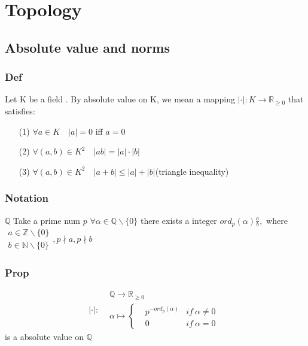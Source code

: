 \documentclass{book}
\begin{document}
\part{Topology}
\chapter{Absolute value and norms}
\section{Def}
Let K be a field . By absolute value on K, we mean a mapping $\lvert \cdot\rvert:K\rightarrow\mathbb{R} _{\geq0}$ that satisfies:\begin{itemize}
    \item[(1)] $\forall a\in K\quad\lvert a\rvert=0 $ iff $a=0$
    \item[(2)] $\forall (a,b)\in K^2\quad\lvert ab\rvert=\lvert a\rvert\cdot\lvert b\rvert$
    \item[(3)] $\forall (a,b)\in K^2\quad\lvert a+b\rvert\leq\lvert a\rvert+\lvert b\rvert$(triangle inequality)
\end{itemize}
\section{Notation}
$\mathbb{Q} $
Take a prime num $p$
$\forall \alpha \in \mathbb{Q} \backslash\{0\}$ there exists a integer $ord_p(\alpha)\frac{a}{b},$ where $\begin{aligned}
    a\in \mathbb{Z} \backslash\{0\}\\
    b\in\mathbb{N} \backslash\{0\}
\end{aligned},p\nmid a,p\nmid b$
\section{Prop}
$$\lvert\cdot\rvert:\begin{aligned}
    &\mathbb{Q} \rightarrow\mathbb{R} _{\geq0}\\
    &\alpha\mapsto\left\{\begin{aligned}
        &p^{-ord_p(\alpha)}&if\ \alpha\not=0\\
        &0 &if\ \alpha=0
    \end{aligned}\right.
\end{aligned}$$ \indent is a absolute value on $\mathbb{Q} $
\end{document}
